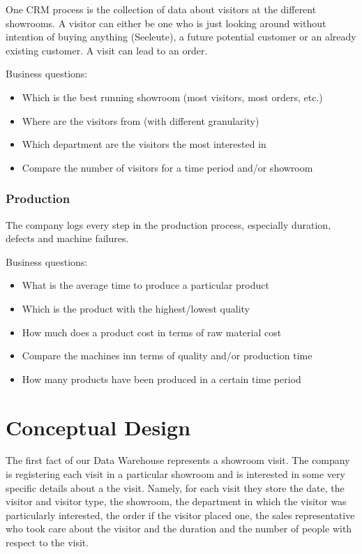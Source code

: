 \documentclass[letterpaper,12pt]{article}
\begin{document}
One CRM process is the collection of data about visitors at the different showrooms. A visitor can either be one who is just looking around without intention of buying anything (Seeleute), a future potential customer or an already existing customer. A visit can lead to an order.

Business questions:
\begin{itemize}
        \item Which is the best running showroom (most visitors, most orders, etc.)
        \item Where are the visitors from (with different granularity)
        \item Which department are the visitors the most interested in
        \item Compare the number of visitors for a time period and/or showroom
\end{itemize}

\subsubsection{Production}

The company logs every step in the production process, especially duration, defects and machine failures.

Business questions:
\begin{itemize}
        \item What is the average time to produce a particular product
        \item Which is the product with the highest/lowest quality
        \item How much does a product cost in terms of raw material cost
				\item Compare the machines inn terms of quality and/or production time
				\item How many products have been produced in a certain time period
\end{itemize}

\section{Conceptual Design}

The first fact of our Data Warehouse represents a showroom visit. The company is registering each visit in a particular showroom and is interested in some very specific details about a the visit. Namely, for each visit they store the date, the visitor and visitor type, the showroom, the department in which the visitor was particularly interested, the order if the visitor placed one, the sales representative who took care about the visitor and the duration and the number of people with respect to the visit.
\end{document}
